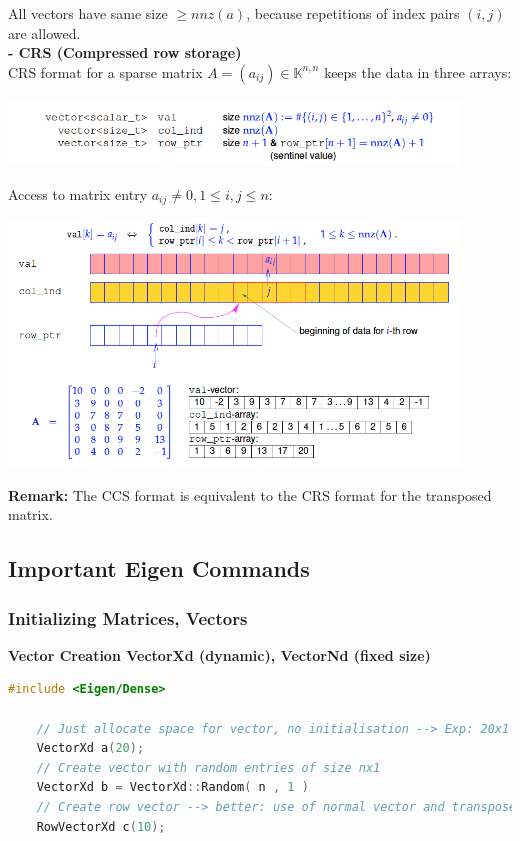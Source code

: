 \documentclass[12pt, a4paper]{article}
\newcommand{\K}{\mathbb{K}}
\begin{document}
All vectors have same size $\geq nnz(a)$, because repetitions of index pairs $(i,j)$ are allowed. \\

\textbf{- CRS (Compressed row storage)} \\
CRS format for a sparse matrix $A = (a_{ij}) \in \K^{n,n}$ keeps the data in three arrays:
\begin{center}
	\includegraphics[width=0.9\textwidth]{SparseMatrix_CRS_structure.png}
\end{center}

Access to matrix entry $a_{ij} \not = 0,1 \leq i,j \leq n$:

\begin{center}
	\includegraphics[width=0.9\textwidth]{SparseMatrix_CRS.png}
\end{center}

\textbf{Remark:} The CCS format is equivalent to the CRS format for the transposed matrix. \\



\subsection{Important Eigen Commands}

\subsubsection{Initializing Matrices, Vectors}

\textbf{Vector Creation \hspace{32mm} \color{blue}VectorXd (dynamic), VectorNd (fixed size)} \color{black}
\begin{lstlisting}[language=C++, caption=Initializing vectors]
	#include <Eigen/Dense>

	// Just allocate space for vector, no initialisation --> Exp: 20x1 vector
	VectorXd a(20);
	// Create vector with random entries of size nx1
	VectorXd b = VectorXd::Random( n , 1 )
	// Create row vector --> better: use of normal vector and transpose
	RowVectorXd c(10);
	
	
\end{lstlisting}
\end{document}
